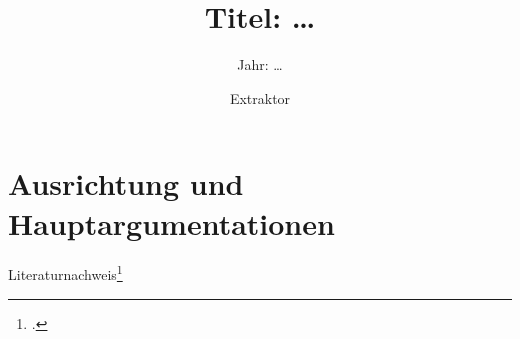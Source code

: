 \documentclass[
  DIV=calc,
  BCOR=5mm,
  11pt,
  headings=small,
  oneside,
  abstract=true,
  toc=bib,
  english,ngerman]{scrartcl}
\begin{document}

\titlehead{Exzerpt (Deutsche Konfiguration)}
\subject{Autor(en): \ldots}
\title{Titel: \ldots}
\subtitle{Jahr: \ldots}
\author{Extraktor}

\maketitle



\section{Ausrichtung und Hauptargumentationen}

Literaturnachweis\footcite[vgl.][15]{Kraemer2012a}

\small




\printnomenclature


\end{document}
